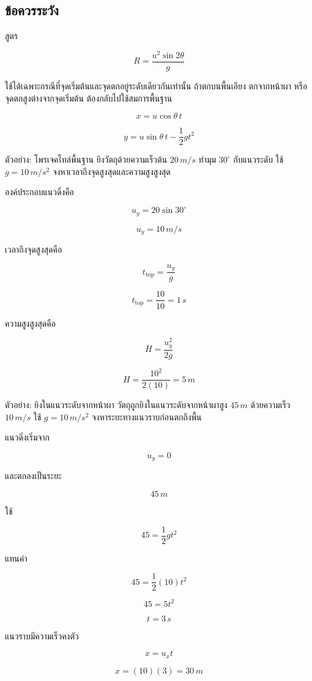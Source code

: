 \subsection{ข้อควรระวัง}

สูตร

\[
R=\frac{u^2\sin2\theta}{g}
\]

ใช้ได้เฉพาะกรณีที่จุดเริ่มต้นและจุดตกอยู่ระดับเดียวกันเท่านั้น ถ้าตกบนพื้นเอียง ตกจากหน้าผา หรือจุดตกสูงต่างจากจุดเริ่มต้น ต้องกลับไปใช้สมการพื้นฐาน

\[
x=u\cos\theta\,t
\]

\[
y=u\sin\theta\,t-\frac{1}{2}gt^2
\]

\begin{examplebox}{ตัวอย่าง: โพรเจคไทล์พื้นฐาน}
ยิงวัตถุด้วยความเร็วต้น $20\,\si{m/s}$ ทำมุม $30^\circ$ กับแนวระดับ ใช้ $g=10\,\si{m/s^2}$ จงหาเวลาถึงจุดสูงสุดและความสูงสูงสุด

องค์ประกอบแนวดิ่งคือ

\[
u_y=20\sin30^\circ
\]

\[
u_y=10\,\si{m/s}
\]

เวลาถึงจุดสูงสุดคือ

\[
t_{\text{top}}=\frac{u_y}{g}
\]

\[
t_{\text{top}}=\frac{10}{10}=1\,\si{s}
\]

ความสูงสูงสุดคือ

\[
H=\frac{u_y^2}{2g}
\]

\[
H=\frac{10^2}{2(10)}=5\,\si{m}
\]
\end{examplebox}

\begin{examplebox}{ตัวอย่าง: ยิงในแนวระดับจากหน้าผา}
วัตถุถูกยิงในแนวระดับจากหน้าผาสูง $45\,\si{m}$ ด้วยความเร็ว $10\,\si{m/s}$ ใช้ $g=10\,\si{m/s^2}$ จงหาระยะทางแนวราบก่อนตกถึงพื้น

แนวดิ่งเริ่มจาก

\[
u_y=0
\]

และตกลงเป็นระยะ

\[
45\,\si{m}
\]

ใช้

\[
45=\frac{1}{2}gt^2
\]

แทนค่า

\[
45=\frac{1}{2}(10)t^2
\]

\[
45=5t^2
\]

\[
t=3\,\si{s}
\]

แนวราบมีความเร็วคงตัว

\[
x=u_xt
\]

\[
x=(10)(3)=30\,\si{m}
\]
\end{examplebox}

